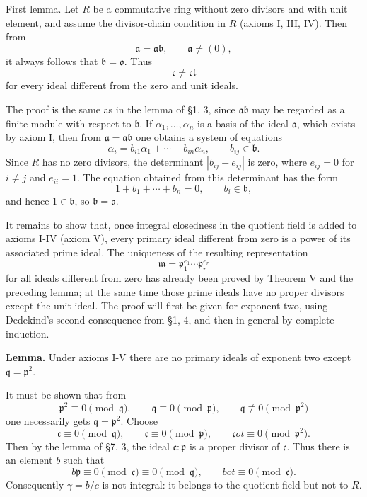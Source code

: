 \documentclass[11pt]{article}
\begin{document}
First lemma. Let \(R\) be a commutative ring without zero divisors and
with unit element, and assume the divisor-chain condition in \(R\)
(axioms I, III, IV). Then from \[
  \mathfrak a=\mathfrak a\mathfrak b,
  \qquad \mathfrak a\ne(0),
\] it always follows that \(\mathfrak b=\mathfrak o\). Thus \[
  \mathfrak c\ne\mathfrak c\mathfrak t
\] for every ideal different from the zero and unit ideals.

The proof is the same as in the lemma of §1, 3, since
\(\mathfrak a\mathfrak b\) may be regarded as a finite module with
respect to \(\mathfrak b\). If \(\alpha_1,\ldots,\alpha_n\) is a basis
of the ideal \(\mathfrak a\), which exists by axiom I, then from
\(\mathfrak a=\mathfrak a\mathfrak b\) one obtains a system of equations
\[
  \alpha_i=b_{i1}\alpha_1+\cdots+b_{in}\alpha_n,
  \qquad b_{ij}\in\mathfrak b.
\] Since \(R\) has no zero divisors, the determinant \(|b_{ij}-e_{ij}|\)
is zero, where \(e_{ij}=0\) for \(i\ne j\) and \(e_{ii}=1\). The
equation obtained from this determinant has the form \[
  1+b_1+\cdots+b_n=0,
  \qquad b_i\in\mathfrak b,
\] and hence \(1\in\mathfrak b\), so \(\mathfrak b=\mathfrak o\).

It remains to show that, once integral closedness in the quotient field
is added to axioms I-IV (axiom V), every primary ideal different from
zero is a power of its associated prime ideal. The uniqueness of the
resulting representation \[
  \mathfrak m=\mathfrak p_1^{e_1}\cdots\mathfrak p_r^{e_r}
\] for all ideals different from zero has already been proved by Theorem
V and the preceding lemma; at the same time those prime ideals have no
proper divisors except the unit ideal. The proof will first be given for
exponent two, using Dedekind's second consequence from §1, 4, and then
in general by complete induction.

\textbf{Lemma.} Under axioms I-V there are no primary ideals of exponent
two except \(\mathfrak q=\mathfrak p^2\).

It must be shown that from \[
  \mathfrak p^2\equiv0\pmod{\mathfrak q},\qquad
  \mathfrak q\equiv0\pmod{\mathfrak p},\qquad
  \mathfrak q\not\equiv0\pmod{\mathfrak p^2}
\] one necessarily gets \(\mathfrak q=\mathfrak p^2\). Choose \[
  \mathfrak c\equiv0\pmod{\mathfrak q},\qquad
  \mathfrak c\equiv0\pmod{\mathfrak p},\qquad
  \mathfrak c
ot\equiv0\pmod{\mathfrak p^2}.
\] Then by the lemma of §7, 3, the ideal \(\mathfrak c:\mathfrak p\) is
a proper divisor of \(\mathfrak c\). Thus there is an element \(b\) such
that \[
  b\mathfrak p\equiv0\pmod{\mathfrak c}
      \equiv0\pmod{\mathfrak q},
  \qquad b
ot\equiv0\pmod{\mathfrak c}.
\] Consequently \(\gamma=b/c\) is not integral: it belongs to the
quotient field but not to \(R\).
\end{document}
